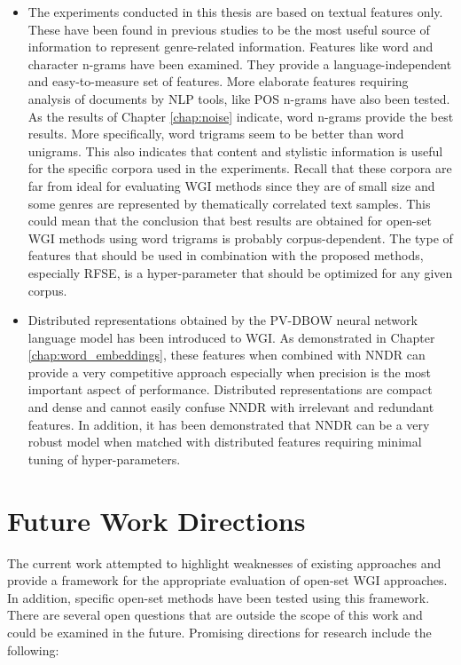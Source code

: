 \begin{itemize}
    \item The experiments conducted in this thesis are based on textual features only. These have been found in previous studies to be the most useful source of information to represent genre-related information. Features like word and character n-grams have been examined. They provide a language-independent and easy-to-measure set of features. More elaborate features requiring analysis of documents by NLP tools, like POS n-grams have also been tested. As the results of Chapter \ref{chap:noise} indicate, word n-grams provide the best results. More specifically, word trigrams seem to be better than word unigrams. This also indicates that content and stylistic information is useful for the specific corpora used in the experiments. Recall that these corpora are far from ideal for evaluating WGI methods since they are of small size and some genres are represented by thematically correlated text samples. This could mean that the conclusion that best results are obtained for open-set WGI methods using word trigrams is probably corpus-dependent. The type of features that should be used in combination with the proposed methods, especially RFSE, is a hyper-parameter that should be optimized for any given corpus.
    \item Distributed representations obtained by the PV-DBOW neural network language model has been introduced to WGI. As demonstrated in Chapter \ref{chap:word_embeddings}, these features when combined with NNDR can provide a very competitive approach especially when precision is the most important aspect of performance. Distributed representations are compact and dense and cannot easily confuse NNDR with irrelevant and redundant features. In addition, it has been demonstrated that NNDR can be a very robust model when matched with distributed features requiring minimal tuning of hyper-parameters.
\end{itemize}

\section{Future Work Directions}

The current work attempted to highlight weaknesses of existing approaches and provide a framework for the appropriate evaluation of open-set WGI approaches. In addition, specific open-set methods have been tested using this framework. There are several open questions that are outside the scope of this work and could be examined in the future. Promising directions for research include the following:

